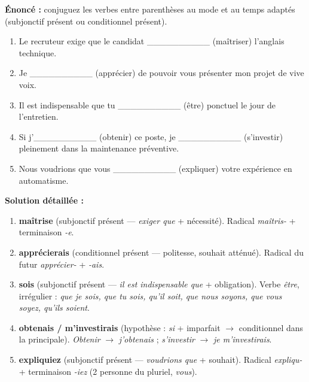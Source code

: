 \documentclass[11pt]{article}
\begin{document}
\begin{exoresolu}
\textbf{Énoncé :} conjuguez les verbes entre parenthèses au mode et au temps adaptés (subjonctif présent ou conditionnel présent).
\begin{enumerate}
  \item Le recruteur exige que le candidat \_\_\_\_\_\_\_\_\_\_ (maîtriser) l'anglais technique.
  \item Je \_\_\_\_\_\_\_\_\_\_ (apprécier) de pouvoir vous présenter mon projet de vive voix.
  \item Il est indispensable que tu \_\_\_\_\_\_\_\_\_\_ (être) ponctuel le jour de l'entretien.
  \item Si j'\_\_\_\_\_\_\_\_\_\_ (obtenir) ce poste, je \_\_\_\_\_\_\_\_\_\_ (s'investir) pleinement dans la maintenance préventive.
  \item Nous voudrions que vous \_\_\_\_\_\_\_\_\_\_ (expliquer) votre expérience en automatisme.
\end{enumerate}
\tcblower
\textbf{Solution détaillée :}
\begin{enumerate}
  \item \textbf{maîtrise} (subjonctif présent — \emph{exiger que} + nécessité). Radical \emph{maîtris-} + terminaison \emph{-e}.
  \item \textbf{apprécierais} (conditionnel présent — politesse, souhait atténué). Radical du futur \emph{apprécier-} + \emph{-ais}.
  \item \textbf{sois} (subjonctif présent — \emph{il est indispensable que} + obligation). Verbe \emph{être}, irrégulier : \emph{que je sois, que tu sois, qu'il soit, que nous soyons, que vous soyez, qu'ils soient}.
  \item \textbf{obtenais / m'investirais} (hypothèse : \emph{si} + imparfait $\rightarrow$ conditionnel dans la principale). \emph{Obtenir} $\rightarrow$ \emph{j'obtenais} ; \emph{s'investir} $\rightarrow$ \emph{je m'investirais}.
  \item \textbf{expliquiez} (subjonctif présent — \emph{voudrions que} + souhait). Radical \emph{expliqu-} + terminaison \emph{-iez} (2 personne du pluriel, \emph{vous}).
\end{enumerate}
\end{exoresolu}
\end{document}
